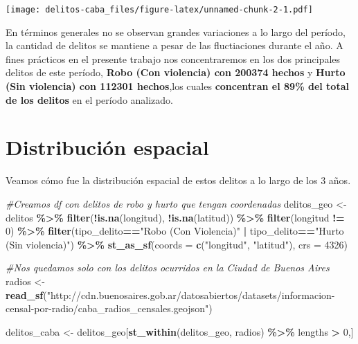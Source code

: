 \documentclass[]{article}
\newenvironment{Shaded}{\begin{snugshade}}{\end{snugshade}}
\newcommand{\CommentTok}[1]{\textcolor[rgb]{0.56,0.35,0.01}{\textit{#1}}}
\newcommand{\DataTypeTok}[1]{\textcolor[rgb]{0.13,0.29,0.53}{#1}}
\newcommand{\DecValTok}[1]{\textcolor[rgb]{0.00,0.00,0.81}{#1}}
\newcommand{\KeywordTok}[1]{\textcolor[rgb]{0.13,0.29,0.53}{\textbf{#1}}}
\newcommand{\NormalTok}[1]{#1}
\newcommand{\OperatorTok}[1]{\textcolor[rgb]{0.81,0.36,0.00}{\textbf{#1}}}
\newcommand{\StringTok}[1]{\textcolor[rgb]{0.31,0.60,0.02}{#1}}
\begin{document}
\texttt{[image: delitos-caba\_files/figure-latex/unnamed-chunk-2-1.pdf]}

En términos generales no se observan grandes variaciones a lo largo del
período, la cantidad de delitos se mantiene a pesar de las fluctiaciones
durante el año. A fines prácticos en el presente trabajo nos
concentraremos en los dos principales delitos de este período,
\textbf{Robo (Con violencia) con 200374 hechos} y \textbf{Hurto (Sin
violencia) con 112301 hechos},los cuales \textbf{concentran el 89\% del
total de los delitos} en el período analizado.

\hypertarget{distribucion-espacial}{%
\section{Distribución espacial}\label{distribucion-espacial}}

Veamos cómo fue la distribución espacial de estos delitos a lo largo de
los 3 años.

\begin{Shaded}
\begin{Highlighting}[]
\CommentTok{\#Creamos df con delitos de robo y hurto que tengan coordenadas}
\NormalTok{delitos\_geo <{-}}\StringTok{ }\NormalTok{delitos }\OperatorTok{\%>\%}\StringTok{ }
\StringTok{  }\KeywordTok{filter}\NormalTok{(}\OperatorTok{!}\KeywordTok{is.na}\NormalTok{(longitud), }\OperatorTok{!}\KeywordTok{is.na}\NormalTok{(latitud)) }\OperatorTok{\%>\%}
\StringTok{  }\KeywordTok{filter}\NormalTok{(longitud }\OperatorTok{!=}\StringTok{ }\DecValTok{0}\NormalTok{) }\OperatorTok{\%>\%}
\StringTok{  }\KeywordTok{filter}\NormalTok{(tipo\_delito}\OperatorTok{==}\StringTok{"Robo (Con Violencia)"} \OperatorTok{|}\StringTok{ }\NormalTok{tipo\_delito}\OperatorTok{==}\StringTok{"Hurto (Sin violencia)"}\NormalTok{) }\OperatorTok{\%>\%}\StringTok{ }
\StringTok{  }\KeywordTok{st\_as\_sf}\NormalTok{(}\DataTypeTok{coords =} \KeywordTok{c}\NormalTok{(}\StringTok{"longitud"}\NormalTok{, }\StringTok{"latitud"}\NormalTok{), }\DataTypeTok{crs =} \DecValTok{4326}\NormalTok{)}

\CommentTok{\#Nos quedamos solo con los delitos ocurridos en la Ciudad de Buenos Aires}
\NormalTok{radios <{-}}\StringTok{ }\KeywordTok{read\_sf}\NormalTok{(}\StringTok{"http://cdn.buenosaires.gob.ar/datosabiertos/datasets/informacion{-}censal{-}por{-}radio/caba\_radios\_censales.geojson"}\NormalTok{)}

\NormalTok{delitos\_caba <{-}}\StringTok{ }\NormalTok{delitos\_geo[}\KeywordTok{st\_within}\NormalTok{(delitos\_geo, radios) }\OperatorTok{\%>\%}\StringTok{ }\NormalTok{lengths }\OperatorTok{>}\StringTok{ }\DecValTok{0}\NormalTok{,]}
\end{Highlighting}
\end{Shaded}
\end{document}
